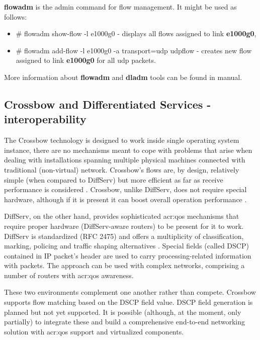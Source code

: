 \documentclass[11pt]{book}
\begin{document}
        \textbf{flowadm} is the admin command for flow management. It might be used as follows:     

        \begin{itemize}
          \item \# flowadm show-flow -l e1000g0 - displays all flows assigned to link \textbf{e1000g0},
          \item \# flowadm add-flow -l e1000g0 -a transport=udp udpflow - creates new flow assigned to link
                \textbf{e1000g0} for all udp packets.
        \end{itemize}

        More information about \textbf{flowadm} and \textbf{dladm} tools can be found in manual.


      \subsection{Crossbow and Differentiated Services - interoperability}
      \label{sub:sol:diffserv}

        The Crossbow technology is designed to work inside single operating system instance, there are no mechanisms
        meant to cope with problems that arise when dealing with installations spanning multiple physical machines
        connected with traditional (non-virtual) network. Crossbow's flows are, by design, relatively simple (when
        compared to DiffServ) but more efficient as far as receive performance is considered \cite{xbow-vertically}.
        Crossbow, unlike DiffServ, does not require special hardware, although if it is present it can boost overall
        operation performance \cite{xbow-vertically}.

        DiffServ, on the other hand, provides sophisticated \gls{acr:qos} mechanisms that require proper hardware (DiffServ-aware
        routers) to be present for it to work. DiffServ is standardized (RFC 2475) and offers a multiplicity of
        classification, marking, policing and traffic shaping alternatives \cite{rfc2475}. Special fields (called DSCP)
        contained in IP packet's header are used to carry processing-related information with packets. The approach can
        be used with complex networks, comprising a number of routers with \gls{acr:qos} awareness.

        These two environments complement one another rather than compete. Crossbow supports flow matching based on the
        DSCP field value. DSCP field generation is planned but not yet supported. It is possible (although, at the
        moment, only partially) to integrate these and build a comprehensive end-to-end networking solution with \gls{acr:qos}
        support and virtualized components.
\end{document}

